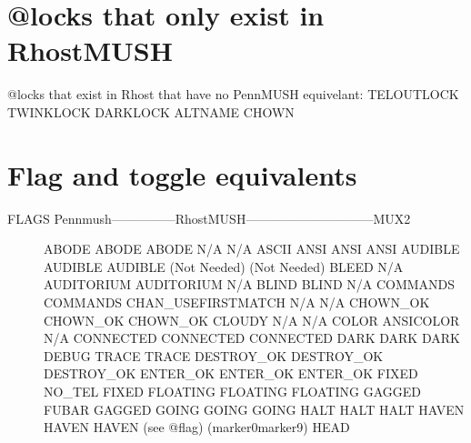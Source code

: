 \documentclass[letterpaper,10pt,english]{sphinxmanual}
\begin{document}
\section{@locks that only exist in RhostMUSH}
\label{\detokenize{differences:locks-that-only-exist-in-rhostmush}}
\sphinxAtStartPar
@locks that exist in Rhost that have no PennMUSH equivelant:
TELOUTLOCK                   TWINKLOCK                     DARKLOCK
ALTNAME                      CHOWN


\section{Flag and toggle equivalents}
\label{\detokenize{differences:flag-and-toggle-equivalents}}\begin{description}
\item[{FLAGS Pennmush—————\sphinxhyphen{}RhostMUSH——————————MUX2}] \leavevmode
\sphinxAtStartPar
ABODE                   ABODE                                  ABODE
N/A                     N/A                                    ASCII
ANSI                    ANSI                                   ANSI
AUDIBLE                 AUDIBLE                                AUDIBLE
(Not Needed)            (Not Needed)                           BLEED
N/A                     AUDITORIUM                             AUDITORIUM
N/A                     BLIND                                  BLIND
N/A                     COMMANDS                               COMMANDS
CHAN\_USEFIRSTMATCH      N/A                                    N/A
CHOWN\_OK                CHOWN\_OK                               CHOWN\_OK
CLOUDY                  N/A                                    N/A
COLOR                   ANSICOLOR                              N/A
CONNECTED               CONNECTED                              CONNECTED
DARK                    DARK                                   DARK
DEBUG                   TRACE                                  TRACE
DESTROY\_OK              DESTROY\_OK                             DESTROY\_OK
ENTER\_OK                ENTER\_OK                               ENTER\_OK
FIXED                   NO\_TEL                                 FIXED
FLOATING                FLOATING                               FLOATING
GAGGED                  FUBAR                                  GAGGED
GOING                   GOING                                  GOING
HALT                    HALT                                   HALT
HAVEN                   HAVEN                                  HAVEN
(see @flag)             (marker0\sphinxhyphen{}marker9)                      HEAD

\end{description}
\end{document}
